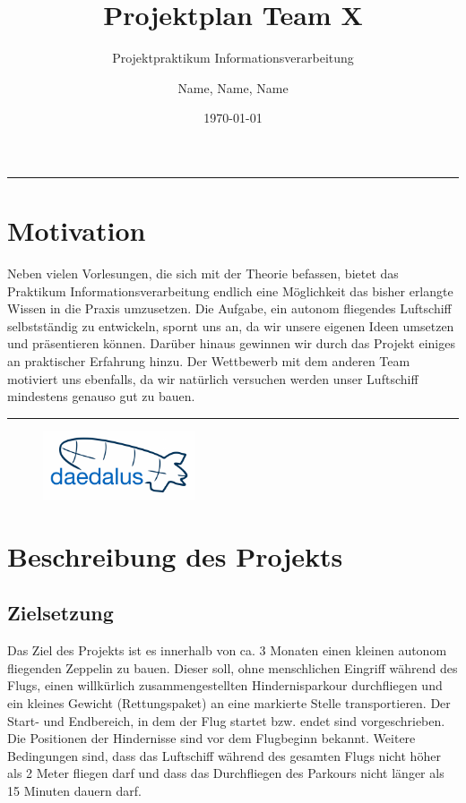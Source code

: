 \documentclass[lang=ngerman,inputenc=utf8,fontsize=10pt]{ldvarticle}
\title{Projektplan Team X}
\subtitle{Projektpraktikum Informationsverarbeitung}
\author{Name, Name, Name}
\date{\today}
\begin{document}
	\maketitle	
	\thispagestyle{empty}
\vspace*{2cm}

\hrule

\section*{Motivation}

Neben vielen Vorlesungen, die sich mit der Theorie befassen, bietet das Praktikum Informationsverarbeitung endlich eine Möglichkeit das bisher erlangte Wissen in die Praxis umzusetzen. Die Aufgabe, ein autonom fliegendes Luftschiff selbstständig zu entwickeln, spornt uns an, da wir unsere eigenen Ideen umsetzen und präsentieren können. Darüber hinaus gewinnen wir durch das Projekt einiges an praktischer Erfahrung hinzu. Der Wettbewerb mit dem anderen Team motiviert uns ebenfalls, da wir natürlich versuchen werden unser Luftschiff mindestens genauso gut zu bauen.   




\vspace*{1cm}
\hrule


\begin{figure}[!b]
\centering
\includegraphics[width=0.4\textwidth]{logo_kl.png}
\end{figure}

\newpage


\section{Beschreibung des Projekts}

\subsection*{Zielsetzung}
Das Ziel des Projekts ist es innerhalb von ca. 3 Monaten einen kleinen autonom fliegenden Zeppelin zu bauen. Dieser soll, ohne menschlichen Eingriff während des Flugs, einen willkürlich zusammengestellten Hindernisparkour durchfliegen und ein kleines Gewicht (Rettungspaket) an eine markierte Stelle transportieren. Der Start- und Endbereich, in dem der Flug startet bzw. endet sind vorgeschrieben. Die Positionen der Hindernisse sind vor dem Flugbeginn bekannt. Weitere Bedingungen sind, dass das Luftschiff während des gesamten Flugs nicht höher als 2 Meter fliegen darf und dass das Durchfliegen des Parkours nicht länger als 15 Minuten dauern darf. 
\end{document}
